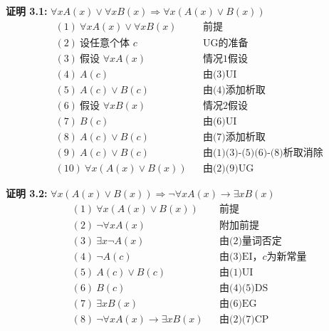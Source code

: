 \documentclass[lang=cn,11pt]{elegantbook}
\begin{document}
\noindent
\textbf{证明 3.1:} $\forall xA(x)\lor \forall xB(x)\Rightarrow \forall x(A(x)\lor B(x))$
\vspace{-10pt}
\begin{align*}
&(1)\ \forall xA(x) \lor \forall xB(x) && \text{前提} \\
&(2)\ \text{设任意个体 $c$} && \text{UG的准备} \\
&(3)\ \text{假设 } \forall xA(x) && \text{情况1假设} \\
&(4)\ A(c) && \text{由(3)UI} \\
&(5)\ A(c) \lor B(c) && \text{由(4)添加析取} \\
&(6)\ \text{假设 } \forall xB(x) && \text{情况2假设} \\
&(7)\ B(c) && \text{由(6)UI} \\
&(8)\ A(c) \lor B(c) && \text{由(7)添加析取} \\
&(9)\ A(c) \lor B(c) && \text{由(1)(3)-(5)(6)-(8)析取消除} \\
&(10)\ \forall x(A(x)\lor B(x)) && \text{由(2)(9)UG}
\end{align*}

\noindent
\textbf{证明 3.2:} $\forall x(A(x)\lor B(x))\Rightarrow \neg\forall xA(x)\to\exists xB(x)$
\vspace{-10pt}
\begin{align*}
&(1)\ \forall x(A(x)\lor B(x)) && \text{前提} \\
&(2)\ \neg\forall xA(x) && \text{附加前提} \\
&(3)\ \exists x\neg A(x) && \text{由(2)量词否定} \\
&(4)\ \neg A(c) && \text{由(3)EI，$c$为新常量} \\
&(5)\ A(c) \lor B(c) && \text{由(1)UI} \\
&(6)\ B(c) && \text{由(4)(5)DS} \\
&(7)\ \exists xB(x) && \text{由(6)EG} \\
&(8)\ \neg\forall xA(x) \to \exists xB(x) && \text{由(2)(7)CP}
\end{align*}
\end{document}
